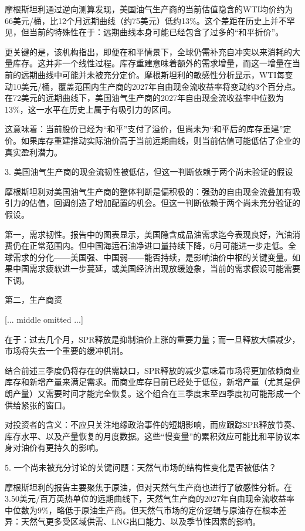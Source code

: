 \documentclass[11pt]{ctexart}
\begin{document}
摩根斯坦利通过逆向测算发现，美国油气生产商的当前估值隐含的WTI均价约为66美元/桶，比12个月远期曲线（约75美元）低约13\%。这个差距在历史上并不罕见，但当前的特殊性在于：远期曲线本身可能已经包含了过多的“和平折价”。

更关键的是，该机构指出，即便在和平情景下，全球仍需补充自冲突以来消耗的大量库存。这并非一个线性过程。库存重建意味着额外的需求增量，而这一增量在当前的远期曲线中可能并未被充分定价。摩根斯坦利的敏感性分析显示，WTI每变动10美元/桶，覆盖范围内生产商的2027年自由现金流收益率将变动约3个百分点。在72美元的远期曲线下，美国油气生产商的2027年自由现金流收益率中位数为13\%，这一水平在历史上属于有吸引力的区间。

这意味着：当前股价已经为“和平”支付了溢价，但尚未为“和平后的库存重建”定价。如果库存重建推动实际油价高于当前远期曲线，则当前估值可能低估了企业的真实盈利潜力。

3. 美国油气生产商的现金流韧性被低估，但这一判断依赖于两个尚未验证的假设

摩根斯坦利对美国油气生产商的整体判断是偏积极的：强劲的自由现金流叠加有吸引力的估值，回调创造了增加配置的机会。但这一判断依赖于两个尚未充分验证的假设。

第一，需求韧性。报告中的图表显示，美国隐含成品油需求迄今表现良好，汽油消费仍在正常范围内。但中国海运石油净进口量持续下降，6月可能进一步走低。全球需求的分化——美国强、中国弱——能否持续，是影响油价中枢的关键变量。如果中国需求疲软进一步蔓延，或美国经济出现放缓迹象，当前的需求假设可能需要下调。

第二，生产商资

[... middle omitted ...]

在于：过去几个月，SPR释放是抑制油价上涨的重要力量；而一旦释放大幅减少，市场将失去一个重要的缓冲机制。

结合前述三季度仍将存在的供需缺口，SPR释放的减少意味着市场将更加依赖商业库存和新增产量来满足需求。而商业库存目前已经处于低位，新增产量（尤其是伊朗产量）又需要时间才能完全恢复。这个组合在三季度末至四季度初可能形成一个供给紧张的窗口。

对投资者的含义：不应只关注地缘政治事件的短期影响，而应跟踪SPR释放节奏、库存水平、以及产量恢复的月度数据。这些“慢变量”的累积效应可能比和平协议本身对油价有更持久的影响。

5. 一个尚未被充分讨论的关键问题：天然气市场的结构性变化是否被低估？

摩根斯坦利的报告主要聚焦于原油，但对天然气生产商也进行了敏感性分析。在3.50美元/百万英热单位的远期曲线下，天然气生产商的2027年自由现金流收益率中位数为9\%，略低于原油生产商。但天然气市场的定价逻辑与原油存在根本差异：天然气更多受区域供需、LNG出口能力、以及季节性因素的影响。
\end{document}
